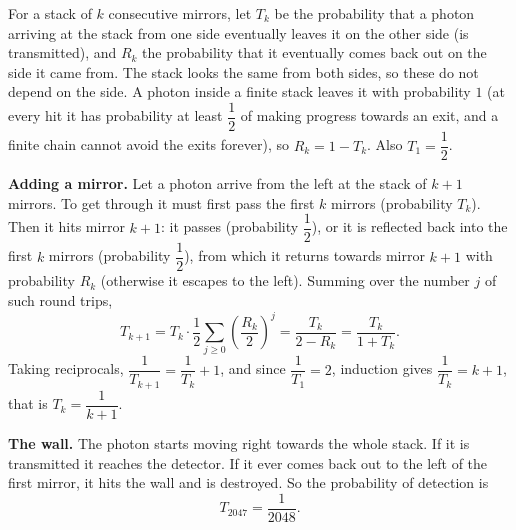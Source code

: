 For a stack of $k$ consecutive mirrors, let $T_k$ be the probability that a photon arriving at the stack from one side eventually leaves it on the other side (is transmitted), and $R_k$ the probability that it eventually comes back out on the side it came from. The stack looks the same from both sides, so these do not depend on the side. A photon inside a finite stack leaves it with probability $1$ (at every hit it has probability at least $\dfrac{1}{2}$ of making progress towards an exit, and a finite chain cannot avoid the exits forever), so $R_k=1-T_k$. Also $T_1=\dfrac{1}{2}$.

\textbf{Adding a mirror.} Let a photon arrive from the left at the stack of $k+1$ mirrors. To get through it must first pass the first $k$ mirrors (probability $T_k$). Then it hits mirror $k+1$: it passes (probability $\dfrac{1}{2}$), or it is reflected back into the first $k$ mirrors (probability $\dfrac{1}{2}$), from which it returns towards mirror $k+1$ with probability $R_k$ (otherwise it escapes to the left). Summing over the number $j$ of such round trips,
\[
T_{k+1}=T_k\cdot\dfrac{1}{2}\sum_{j\ge0}\left(\dfrac{R_k}{2}\right)^j=\dfrac{T_k}{2-R_k}=\dfrac{T_k}{1+T_k}.
\]
Taking reciprocals, $\dfrac{1}{T_{k+1}}=\dfrac{1}{T_k}+1$, and since $\dfrac{1}{T_1}=2$, induction gives $\dfrac{1}{T_k}=k+1$, that is $T_k=\dfrac{1}{k+1}$.

\textbf{The wall.} The photon starts moving right towards the whole stack. If it is transmitted it reaches the detector. If it ever comes back out to the left of the first mirror, it hits the wall and is destroyed. So the probability of detection is
\[
T_{2047}=\boxed{\dfrac{1}{2048}}.
\]
